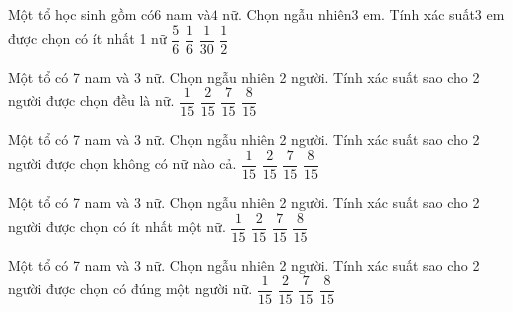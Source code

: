 \begin{ex}
Một tổ học sinh gồm có$6$ nam và$4$ nữ. Chọn ngẫu nhiên$3$ em. Tính xác suất$3$ em được chọn có ít nhất 1 nữ
\choice
{\True $\dfrac{5}{6}$}
{$\dfrac{1}{6}$}
{$\dfrac{1}{30}$}
{$\dfrac{1}{2}$}
\end{ex}
\begin{ex}
Một tổ có 7 nam và 3 nữ. Chọn ngẫu nhiên 2 người. Tính xác suất sao cho 2 người được chọn đều là nữ.
\choice
{\True $\dfrac{1}{15}$}
{$\dfrac{2}{15}$}
{$\dfrac{7}{15}$}
{$\dfrac{8}{15}$}
\end{ex}
\begin{ex}
Một tổ có 7 nam và 3 nữ. Chọn ngẫu nhiên 2 người. Tính xác suất sao cho 2 người được chọn không có nữ nào cả.
\choice
{$\dfrac{1}{15}$}
{$\dfrac{2}{15}$}
{\True $\dfrac{7}{15}$}
{$\dfrac{8}{15}$}
\end{ex}
\begin{ex}
Một tổ có 7 nam và 3 nữ. Chọn ngẫu nhiên 2 người. Tính xác suất sao cho 2 người được chọn có ít nhất một nữ.
\choice
{$\dfrac{1}{15}$}
{$\dfrac{2}{15}$}
{$\dfrac{7}{15}$}
{\True $\dfrac{8}{15}$}
\end{ex}
\begin{ex}
Một tổ có 7 nam và 3 nữ. Chọn ngẫu nhiên 2 người. Tính xác suất sao cho 2 người được chọn có đúng một người nữ.
\choice
{$\dfrac{1}{15}$}
{$\dfrac{2}{15}$}
{\True $\dfrac{7}{15}$}
{$\dfrac{8}{15}$}
\end{ex}
